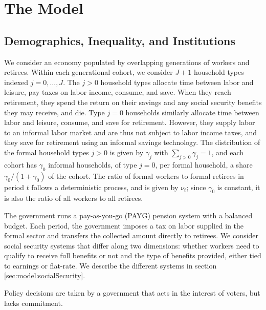 \section{The Model}\label{sec:model}
\subsection{Demographics, Inequality, and Institutions}\label{sec:model:Demo}
We consider an economy populated by overlapping generations of workers and retirees. Within each generational cohort, we consider $J+1$ household types indexed $j = 0, \dots, J$. The $j>0$ household types allocate time between labor and leisure, pay taxes on labor income, consume, and save. When they reach retirement, they spend the return on their savings and any social security benefits they may receive, and die. Type $j=0$ households similarly allocate time between labor and leisure, consume, and save for retirement. However, they supply labor to an informal labor market and are thus not subject to labor income taxes, and they save for retirement using an informal savings technology. The distribution of the formal household types $j>0$ is given by $\gamma_j$ with $\sum_{j>0} \gamma_j = 1$, and each cohort has $\gamma_0$ informal households, of type $j=0$, per formal household, a share $\gamma_0/(1+\gamma_0)$ of the cohort. The ratio of formal workers to formal retirees in period $t$ follows a deterministic process, and is given by $\nu_t$; since $\gamma_0$ is constant, it is also the ratio of all workers to all retirees.


The government runs a pay-as-you-go (PAYG) pension system with a balanced budget. Each period, the government imposes a tax on labor supplied in the formal sector and transfers the collected amount directly to retirees. We consider social security systems that differ along two dimensions: whether workers need to qualify to receive full benefits or not and the type of benefits provided, either tied to earnings or flat-rate. We describe the different systems in section \ref{sec:model:socialSecurity}. 

Policy decisions are taken by a government that acts in the interest of voters, but lacks commitment.

